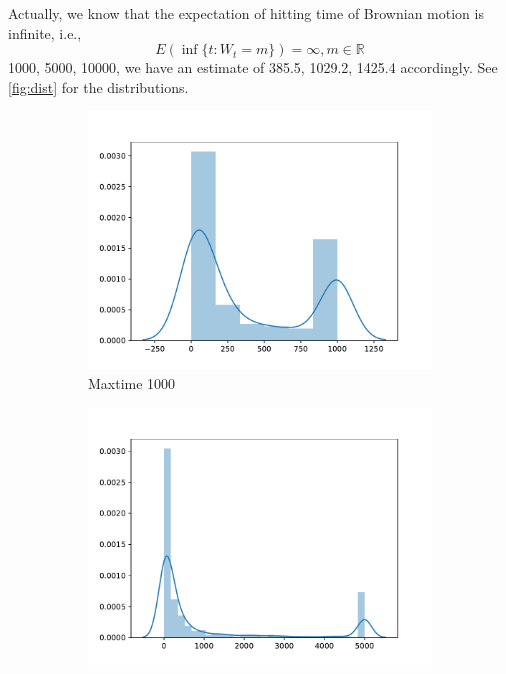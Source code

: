 \documentclass{homework}
\begin{document}
\begin{subproblem}[\roman*)]
{            Actually, we know that the expectation of hitting time of Brownian
            motion is infinite, i.e.,
            \[E(\inf{\{t:W_t=m\}})=\infty,m\in\mathbb R\]
        } 1000, 5000, 10000,
        we have an estimate
        of 385.5, 1029.2, 1425.4 accordingly. See \cref{fig:dist}
        for the distributions.
        \begin{figure}[h]
            \centering
            \begin{subfigure}[b]{0.3\textwidth}
                \includegraphics[width=\textwidth]{max=1000}
                \caption{Maxtime 1000}
            \end{subfigure}
            \begin{subfigure}[b]{0.3\textwidth}
                \includegraphics[width=\textwidth]{max=5000}

\end{subfigure}
\end{figure}
\end{subproblem}
\end{document}

